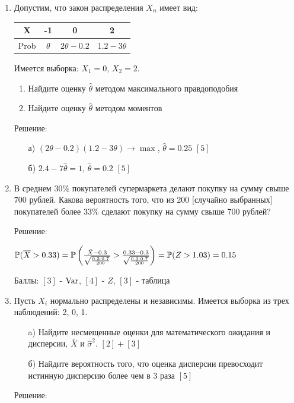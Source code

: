 \documentclass[12pt, a4paper]{article}\usepackage[]{graphicx}\usepackage[]{color}
\begin{document}
\begin{enumerate}
\item Допустим, что закон распределения $X_{n}$ имеет вид:

\begin{tabular}{|c|c|c|c|}
  \hline
  X & -1 & 0 & 2 \\
  \hline
  Prob & $\theta$ & $2\theta-0.2$ & $1.2-3\theta$ \\
  \hline
\end{tabular}

Имеется выборка: $X_{1}=0$, $X_{2}=2$.
\begin{enumerate}
\item Найдите оценку $\hat{\theta}$ методом максимального правдоподобия
\item Найдите оценку $\hat{\theta}$ методом моментов
\end{enumerate}

Решение:
\begin{enumerate}
\item[а)] $(2\theta-0.2)(1.2-3\theta)\rightarrow\max$,
$\hat{\theta}=0.25$ $[5]$\\
\item[б)] $2.4-7\hat{\theta}=1$, $\hat{\theta}=0.2$ $[5]$
\end{enumerate}

\item В среднем 30\% покупателей супермаркета делают покупку на сумму
свыше 700 рублей. Какова вероятность того, что из 200 $[$случайно
выбранных$]$ покупателей
более 33\% сделают покупку на сумму свыше 700 рублей?

Решение:

$\P(\overline{X}>0.33)=\P\left(\frac{\bar{X}-0.3}{\sqrt{\frac{0.3\cdot
0.7}{200}}}>\frac{0.33-0.3}{\sqrt{\frac{0.3\cdot
0.7}{200}}}\right)=\P(Z>1.03)=0.15$

Баллы: $[3]$ - $\Var$, $[4]$ - $Z$, $[3]$ - таблица

\item Пусть $X_{i}$ нормально распределены и
независимы. Имеется выборка
из трех наблюдений: 2, 0, 1.
\begin{enumerate}
\item[a)] Найдите несмещенные оценки для математического ожидания и
дисперсии, $\bar{X}$ и $\hat{\sigma}^{2}$. $[2]+[3]$
\item[б)] Найдите вероятность того, что оценка дисперсии превосходит
истинную дисперсию более чем в 3 раза $[5]$
\end{enumerate}
Решение:


\end{enumerate}
\end{document}
